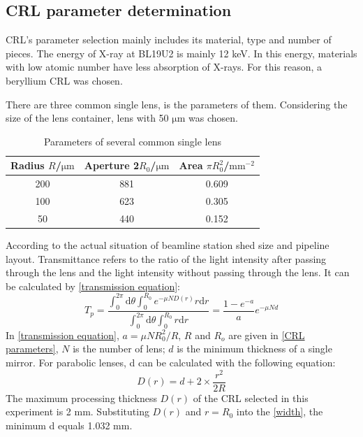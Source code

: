 \documentclass{Head}
\begin{document}
\subsection{CRL parameter determination}
CRL's parameter selection mainly includes its material, type and number of pieces.
The energy of X-ray at BL19U2 is mainly 12 keV.
In this energy, materials with low atomic number have less absorption of X-rays.
For this reason, a beryllium CRL was chosen.


There are three common single lens, is the parameters of them.
Considering the size of the lens container, lens with 50 $\mathrm{\mu m}$ was chosen.
\begin{table}
  \centering
  \caption{Parameters of several common single lens}
  \begin{tabular}{ccc}
    \toprule
    Radius $R$/$\mathrm{\mu m}$ & Aperture 2$R_0$/$\mathrm{\mu m}$ & Area $\pi R_0^2$/$\mathrm{mm^{-2}}$ \\
    \midrule
    200                         & 881                              & 0.609                               \\
    100                         & 623                              & 0.305                               \\
    50                          & 440                              & 0.152                               \\
    \bottomrule
  \end{tabular}
  \label{CRL parameters}
\end{table}

According to the actual situation of beamline station shed size and pipeline layout.
Transmittance refers to the ratio of the light intensity after passing through the lens and the light intensity without passing through the lens.
It can be calculated by \autoref{transmission equation}:
\begin{equation}
  T_p=\frac{\int_0^{2\pi}\mathrm{d}\theta\int_0^{R_0}e^{-\mu ND(r)}r\mathrm{d}r}{\int_0^{2\pi}\mathrm{d}\theta\int_0^{R_0}r\mathrm{d}r}=\frac{1-e^{-a}}{a}e^{-\mu Nd}
  \label{transmission equation}
\end{equation}
In \autoref{transmission equation}, $a=\mu N R_0^2/R$, $R$ and $R_o$ are given in \autoref{CRL parameters}, $N$ is the number of lens; $d$ is the minimum thickness of a single mirror.
For parabolic lenses, d can be calculated with the following equation:
\begin{equation}
  D(r)=d+2\times \frac{r^2}{2R}
  \label{width}
\end{equation}
The maximum processing thickness $D(r)$ of the CRL selected in this experiment is 2 mm.
Substituting $D(r)$ and $r=R_0$ into the \autoref{width}, the minimum d equals 1.032 mm.
\end{document}

